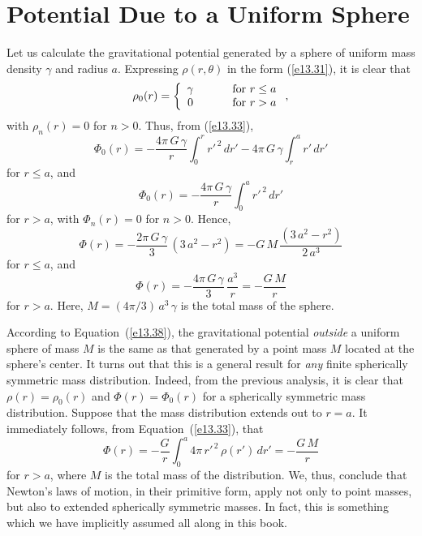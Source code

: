 \section{Potential Due to a Uniform Sphere}
Let us calculate the gravitational potential generated by a sphere of
uniform mass density $\gamma$ and radius $a$. Expressing $\rho(r,\theta)$
in the form (\ref{e13.31}), it is clear that
\begin{equation}
\rho_0(r) = \left\{\begin{array}{ccc}
\gamma&\mbox{\hspace{0.5cm}}&\mbox{for $r\leq a$}\\
0&&\mbox{for $r>a$}\end{array}\right.,
\end{equation}
with $\rho_n(r)=0$ for $n>0$. Thus, from (\ref{e13.33}),
\begin{equation}
\Phi_0(r) = -\frac{4\pi\,G\,\gamma}{r}\int_0^r r'^{\,2}\,dr' - 4\pi\,G\,\gamma
\int_r^a r'\,dr'
\end{equation}
for $r\leq a$, and
\begin{equation}
\Phi_0(r) = - \frac{4\pi\,G\,\gamma}{r}\int_0^a r'^{\,2}\,dr'
\end{equation}
for $r>a$, with $\Phi_n(r)=0$ for $n>0$. Hence,
\begin{equation}\label{e13.37}
\Phi(r) = - \frac{2\pi\,G\,\gamma}{3}\,(3\,a^2-r^2) = - G\,M\,\frac{(3\,a^2-r^2)}{2\,a^3}
\end{equation}
for $r\leq a$, and
\begin{equation}\label{e13.38}
\Phi(r) = -\frac{4\pi\,G\,\gamma}{3}\,\frac{a^3}{r} = - \frac{G\,M}{r}
\end{equation}
for $r>a$. Here, $M=(4\pi/3)\,a^3\,\gamma$ is the total mass of the sphere.

According to Equation~(\ref{e13.38}), the gravitational potential {\em outside}\/ a uniform sphere of mass $M$ is the same as that generated by a point mass $M$ located
at the sphere's center. It turns out that this is a general result for {\em any}\/
finite spherically symmetric mass distribution. 
Indeed,  from the
previous analysis, it is clear that 
$\rho(r)=\rho_0(r)$ and $\Phi(r) = \Phi_0(r)$ for a spherically symmetric mass distribution.  Suppose that the mass
distribution extends out to $r=a$. It immediately follows, from Equation~(\ref{e13.33}),
that
\begin{equation}
\Phi(r) = - \frac{G}{r}\int_0^a 4\pi\,r'^{\,2}\,\rho(r')\,dr' = -\frac{G\,M}{r}
\end{equation}
for $r>a$, 
where $M$ is the total mass of the distribution. We, thus, conclude that
Newton's laws of motion, in their primitive form, apply not only to
point masses, but also to extended spherically symmetric masses. In fact, this
is something which we have implicitly assumed all along in this book.


